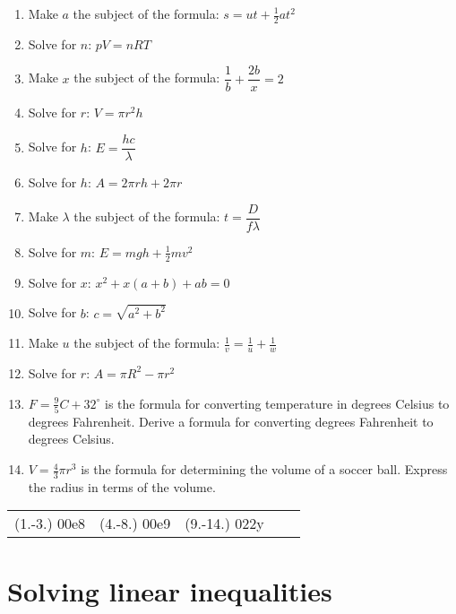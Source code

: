 \begin{exercises}{}
{
\begin{enumerate}[itemsep=5pt, label=\textbf{\arabic*}. ] 
\item Make $a$ the subject of the formula: $s=ut+\frac{1}{2}at^{2}$
\item Solve for $n$: $pV=nRT$ 
\item Make $x$ the subject of the formula: $\dfrac{1}{b}+\dfrac{2b}{x}=2$
\item Solve for $r$: $V = \pi r^{2} h$
\item Solve for $h$: $E=\dfrac{hc}{\lambda}$
\item Solve for $h$: $A=2\pi rh + 2 \pi r$
\item Make $\lambda$ the subject of the formula: $t=\dfrac{D}{f \lambda}$
\item Solve for $m$: $E=mgh + \frac{1}{2}mv^{2}$
\item Solve for $x$: $x^2+x(a+b)+ab=0$
\item Solve for $b$: $c=\sqrt{a^2+b^2}$
\item Make $u$ the subject of the formula: $\frac{1}{v}=\frac{1}{u}+\frac{1}{w}$
\item Solve for $r$: $A=\pi R^2 -\pi r^2$
\item $F=\frac{9}{5}C + 32^\circ$ is the formula for converting temperature in degrees Celsius to degrees Fahrenheit. Derive a formula for converting degrees Fahrenheit to degrees Celsius.
\item $V=\frac{4}{3}\pi r^3$ is the formula for determining the volume of a soccer ball. Express the radius in terms of the volume.
\end{enumerate}
\practiceinfo
\par 
\par \begin{tabular}[h]{ccccc}
(1.-3.) 00e8&   (4.-8.) 00e9 & (9.-14.) 022y\end{tabular}
}
\end{exercises}

\section{Solving linear inequalities}
\nopagebreak

